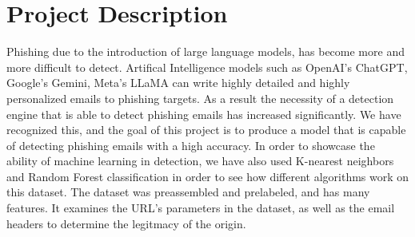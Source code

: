 \section{Project Description}

Phishing due to the introduction of large language models, has become more and more difficult to detect. Artifical Intelligence models such as OpenAI's ChatGPT, Google's Gemini, Meta's LLaMA can write highly detailed and highly personalized emails to phishing targets. As a result the necessity of a detection engine that is able to detect phishing emails has increased significantly. We have recognized this, and the goal of this project is to produce a model that is capable of detecting phishing emails with a high accuracy. In order to showcase the ability of machine learning in detection, we have also used K-nearest neighbors and Random Forest classification in order to see how different algorithms work on this dataset. The dataset was preassembled and prelabeled, and has many features. It examines the URL's parameters in the dataset, as well as the email headers to determine the legitmacy of the origin. 